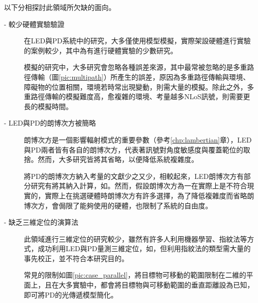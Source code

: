     

    

        
    

        




        
    以下分相探討此領域所欠缺的面向。
    
    \begin{description}

        \item[- 較少硬體實驗驗證]\hfill 
        
        \qquad
        在LED與PD系統中的研究，大多僅使用模型模擬，實際架設硬體進行實驗的案例較少，其中\cite{case:hypercube}\cite{case:3d_layers}為有進行硬體實驗的少數研究。

        \qquad
        模擬的研究中，大多研究會忽略各種誤差來源，其中最常被忽略的是多重路徑傳輸（圖\ref{pic:multipath}）所產生的誤差，原因為多重路徑傳輸與環境、障礙物的位置相關，環境若時常出現變動，則需大量的模擬。除此之外，多重路徑傳輸的模擬難度高，愈複雜的環境、考量越多NLoS訊號，則需要更長的模擬時間。

        \item[- LED與PD的朗博次方被簡略]\hfill 
        
        \qquad
        朗博次方是一個影響輻射模式的重要參數（參考\ref{chp:lambertian}章），LED與PD兩者皆有各自的朗博次方，代表著訊號對角度敏感度與覆蓋範位的取捨。然而，大多研究皆將其省略，以便降低系統複雜度。
        
        \qquad
        將PD的朗博次方納入考量的文獻少之又少，相較起來，LED朗博次方有部分研究有將其納入計算，如\cite{case:cart2d}\cite{case:cart3d}。然而，假設朗博次方為一在實際上是不符合現實的，實際上在挑選硬體時朗博次方有許多選擇，為了降低複雜度而省略朗博次方，會侷限了能夠使用的硬體，也限制了系統的自由度。

        \item[- 缺乏三維定位的演算法]\hfill 
        
        \qquad
        此領域進行三維定位的研究較少，雖然有許多人利用機器學習、指紋法等方式，成功利用LED與PD量測三維定位，如\cite{case:ml}，但利用指紋法的類型需大量的事先校正，並不符合本研究目的。

        \qquad 
        常見的限制如圖\ref{pic:case_parallel}，將目標物可移動的範圍限制在二維的平面上，且在大多實驗中，都會將目標物與可移動範圍的垂直距離設為已知，即可將PD的光傳遞模型簡化。


\end{description}
